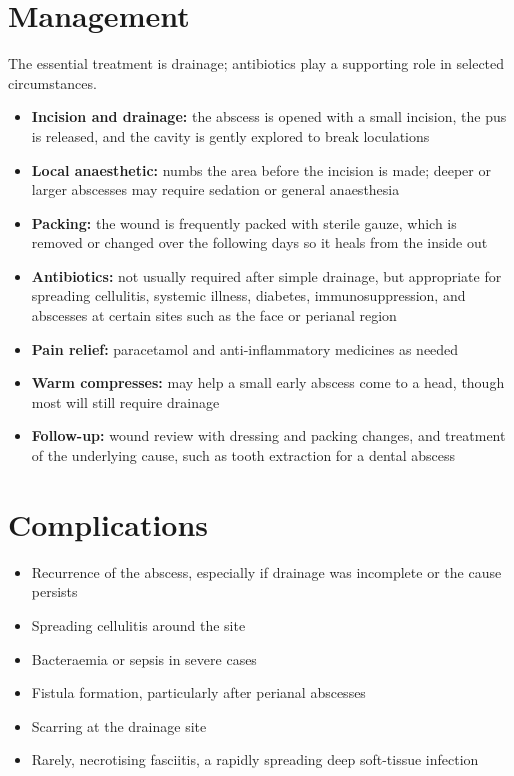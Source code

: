 \section*{Management}
The essential treatment is drainage; antibiotics play a supporting role in selected circumstances.

\begin{itemize}
    \item \textbf{Incision and drainage:} the abscess is opened with a small incision, the pus is released, and the cavity is gently explored to break loculations
    \item \textbf{Local anaesthetic:} numbs the area before the incision is made; deeper or larger abscesses may require sedation or general anaesthesia
    \item \textbf{Packing:} the wound is frequently packed with sterile gauze, which is removed or changed over the following days so it heals from the inside out
    \item \textbf{Antibiotics:} not usually required after simple drainage, but appropriate for spreading cellulitis, systemic illness, diabetes, immunosuppression, and abscesses at certain sites such as the face or perianal region
    \item \textbf{Pain relief:} paracetamol and anti-inflammatory medicines as needed
    \item \textbf{Warm compresses:} may help a small early abscess come to a head, though most will still require drainage
    \item \textbf{Follow-up:} wound review with dressing and packing changes, and treatment of the underlying cause, such as tooth extraction for a dental abscess
\end{itemize}

\section*{Complications}
\begin{itemize}
    \item Recurrence of the abscess, especially if drainage was incomplete or the cause persists
    \item Spreading cellulitis around the site
    \item Bacteraemia or sepsis in severe cases
    \item Fistula formation, particularly after perianal abscesses
    \item Scarring at the drainage site
    \item Rarely, necrotising fasciitis, a rapidly spreading deep soft-tissue infection
\end{itemize}

